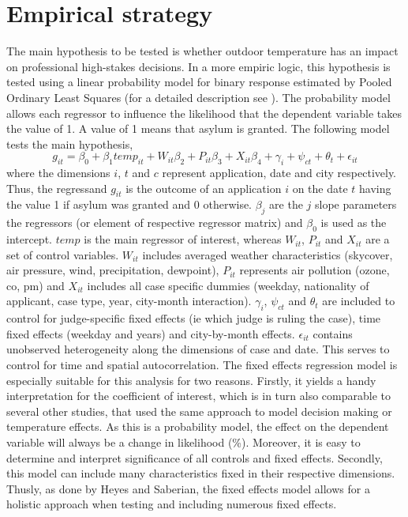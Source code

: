 \documentclass[11pt]{article}
\begin{document}
	\section{Empirical strategy}
	The main hypothesis to be tested is whether outdoor temperature has an impact on professional high-stakes decisions. In a more empiric logic, this hypothesis is tested using a linear probability model for binary response estimated by Pooled Ordinary Least Squares (for a detailed description see \cite{wooldridge2010econometric}). The probability model allows each regressor to influence the likelihood that the dependent variable takes the value of 1. A value of 1 means that asylum is granted. The following model tests the main hypothesis, 
	\newline
	\begin{equation}
		g_{ it } = \beta_{0} + \beta_{1 }temp_{it} + W_{it}\beta_{2} + P_{it}\beta_{3} + X_{it}\beta_{4} + \gamma_{i} + \psi_{ct} + \theta_{t} + \epsilon_{it}
	\end{equation}
	where the dimensions \(i\), \(t\) and \(c\) represent application, date and city respectively. Thus, the regressand \(g_{ it }\) is the outcome of an application \(i\) on the date \(t\) having the value 1 if asylum was granted and 0 otherwise. \(\beta_{j}\) are the \(j\) slope parameters the regressors (or element of respective regressor matrix) and \(\beta_{0}\) is used as the intercept. \(temp\) is the main regressor of interest, whereas \(W_{it}\), \(P_{it}\) and \(X_{it}\) are a set of control variables. \(W_{it}\) includes averaged weather characteristics (skycover, air pressure, wind, precipitation, dewpoint), \(P_{it}\) represents air pollution (ozone, co, pm) and \(X_{it}\) includes all case specific dummies (weekday, nationality of applicant, case type, year, city-month interaction). \(\gamma_{i}\), \(\psi_{ct}\) and \(\theta_{t}\) are included to control for judge-specific fixed effects (ie which judge is ruling the case), time fixed effects (weekday and years) and city-by-month effects. \(\epsilon_{it}\) contains unobserved heterogeneity along the dimensions of case and date. This serves to control for time and spatial autocorrelation. 
	The fixed effects regression model is especially suitable for this analysis for two reasons. Firstly, it yields a handy interpretation for the coefficient of interest, which is in turn also comparable to several other studies, that used the same approach to model decision making or temperature effects. As this is a probability model, the effect on the dependent variable will always be a change in likelihood (\%). Moreover, it is easy to determine and interpret significance of all controls and fixed effects. Secondly, this model can include many characteristics fixed in their respective dimensions. Thusly, as done by Heyes and Saberian, the fixed effects model allows for a holistic approach when testing and including numerous fixed effects.
\end{document}
